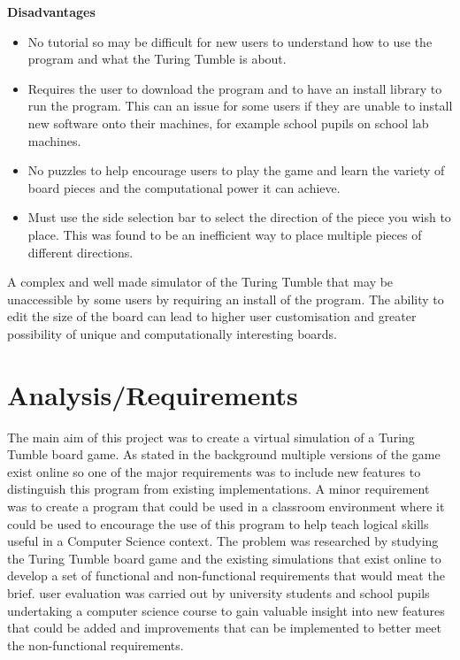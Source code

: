 \documentclass{l4proj}
\begin{document}
\textbf{Disadvantages}
\begin{itemize}
    \item No tutorial so may be difficult for new users to understand how to use the program and what the Turing Tumble is about.
    \item Requires the user to download the program and to have an install library to run the program. This can an issue for some users if they are unable to install new software onto their machines, for example school pupils on school lab machines.
    \item No puzzles to help encourage users to play the game and learn the variety of board pieces and the computational power it can achieve.
    \item Must use the side selection bar to select the direction of the piece you wish to place. This was found to be an inefficient way to place multiple pieces of different directions.
\end{itemize}

A complex and well made simulator of the Turing Tumble that may be unaccessible by some users by requiring an install of the program. The ability to edit the size of the board can lead to higher user customisation and greater possibility of unique and computationally interesting boards. 
\chapter{Analysis/Requirements}




The main aim of this project was to create a virtual simulation of a Turing Tumble board game. As stated in the background multiple versions of the game exist online so one of the major requirements was to include new features to distinguish this program from existing implementations. A minor requirement was to create a program that could be used in a classroom environment where it could be used to encourage the use of this program to help teach logical skills useful in a Computer Science context. The problem was researched by studying the Turing Tumble board game and the existing simulations that exist online to develop a set of functional and non-functional requirements that would meat the brief. user evaluation was carried out by university students and school pupils undertaking a computer science course to gain valuable insight into new features that could be added and improvements that can be implemented to better meet the non-functional requirements.
\end{document}
